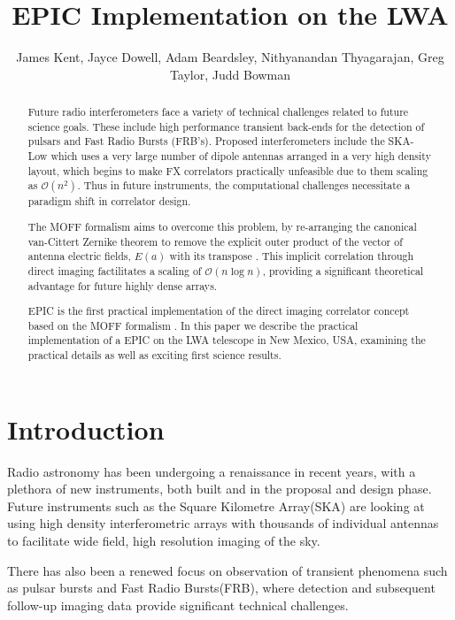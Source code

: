 \documentclass[bibliography=totocnumbered, twocolumn]{article}
\title{EPIC Implementation on the LWA}
\author{James Kent, Jayce Dowell, Adam Beardsley, Nithyanandan Thyagarajan, Greg Taylor, Judd Bowman}
\begin{document}
\maketitle
\begin{abstract}

  Future radio interferometers face a variety of technical challenges related
  to future science goals. These include high performance transient back-ends
  for the detection of pulsars and Fast Radio Bursts (FRB's). Proposed
  interferometers include the SKA-Low which uses a very large number of dipole
  antennas arranged in a very high density layout, which begins to make FX
  correlators practically unfeasible due to them scaling as $\mathcal{O}(n^2)$.
  Thus in future instruments, the computational challenges necessitate a
  paradigm shift in correlator design.

  The MOFF formalism aims to overcome this problem, by re-arranging the canonical
  van-Cittert Zernike theorem to remove the explicit outer product of the vector of
  antenna electric fields, $E(a)$ with its transpose \cite{morales_enabling_2011}.
  This implicit correlation through direct imaging factilitates a scaling of
  $\mathcal{O}(n\log{n})$, providing a significant theoretical advantage for
  future highly dense arrays.

  EPIC is the first practical implementation of the direct imaging correlator
  concept based on the MOFF formalism \cite{thyagarajan_generic_2017}. In this
  paper we describe the practical implementation of a EPIC on the LWA telescope
  in New Mexico, USA, examining the practical details as well as exciting first
  science results.

  
\end{abstract}
\section{Introduction}

Radio astronomy has been undergoing a renaissance in recent years,
with a plethora of new instruments, both built and in the proposal
and design phase. Future  instruments such as the Square Kilometre
Array(SKA) are looking at using high density interferometric arrays
with thousands of individual antennas to facilitate wide field,
high resolution imaging of the sky.

There has also been a renewed focus on observation of transient
phenomena such as pulsar bursts and Fast Radio Bursts(FRB), where
detection and subsequent follow-up imaging data provide significant
technical challenges.
\end{document}
